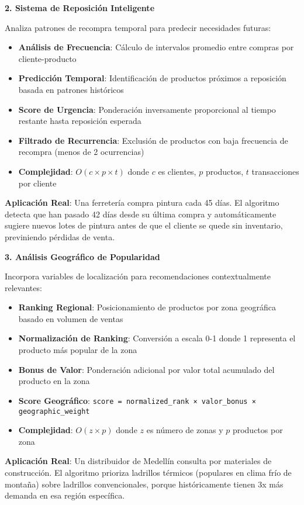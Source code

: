 \documentclass[twocolumn]{article}
\begin{document}
\textbf{2. Sistema de Reposición Inteligente}

Analiza patrones de recompra temporal para predecir necesidades futuras:

\begin{itemize}
    \item \textbf{Análisis de Frecuencia}: Cálculo de intervalos promedio entre compras por cliente-producto
    \item \textbf{Predicción Temporal}: Identificación de productos próximos a reposición basada en patrones históricos
    \item \textbf{Score de Urgencia}: Ponderación inversamente proporcional al tiempo restante hasta reposición esperada
    \item \textbf{Filtrado de Recurrencia}: Exclusión de productos con baja frecuencia de recompra (menos de 2 ocurrencias)
    \item \textbf{Complejidad}: \(O(c \times p \times t)\) donde \(c\) es clientes, \(p\) productos, \(t\) transacciones por cliente
\end{itemize}

\textbf{Aplicación Real}: Una ferretería compra pintura cada 45 días. El algoritmo detecta que han pasado 42 días desde su última compra y automáticamente sugiere nuevos lotes de pintura antes de que el cliente se quede sin inventario, previniendo pérdidas de venta.

\textbf{3. Análisis Geográfico de Popularidad}

Incorpora variables de localización para recomendaciones contextualmente relevantes:

\begin{itemize}
    \item \textbf{Ranking Regional}: Posicionamiento de productos por zona geográfica basado en volumen de ventas
    \item \textbf{Normalización de Ranking}: Conversión a escala 0-1 donde 1 representa el producto más popular de la zona
    \item \textbf{Bonus de Valor}: Ponderación adicional por valor total acumulado del producto en la zona
    \item \textbf{Score Geográfico}: \texttt{score = normalized\_rank × valor\_bonus × geographic\_weight}
    \item \textbf{Complejidad}: \(O(z \times p)\) donde \(z\) es número de zonas y \(p\) productos por zona
\end{itemize}

\textbf{Aplicación Real}: Un distribuidor de Medellín consulta por materiales de construcción. El algoritmo prioriza ladrillos térmicos (populares en clima frío de montaña) sobre ladrillos convencionales, porque históricamente tienen 3x más demanda en esa región específica.
\end{document}
